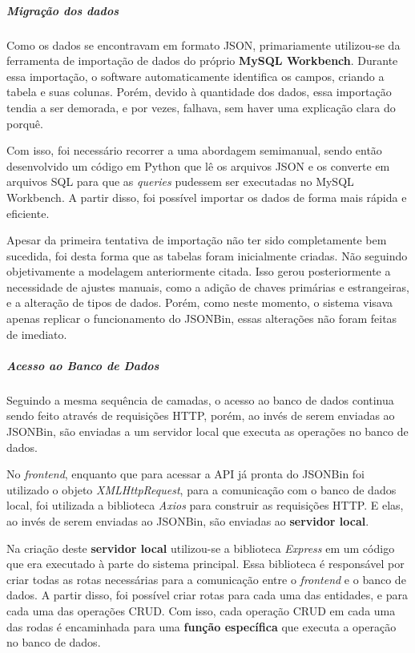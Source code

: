 \subparagraph*{Migração dos dados}

Como os dados se encontravam em formato JSON, primariamente utilizou-se da ferramenta de importação de dados do próprio \textbf{MySQL Workbench}. Durante essa importação, o software automaticamente identifica os campos, criando a tabela e suas colunas. Porém, devido à quantidade dos dados, essa importação tendia a ser demorada, e por vezes, falhava, sem haver uma explicação clara do porquê.

Com isso, foi necessário recorrer a uma abordagem semimanual, sendo então desenvolvido um código em Python que lê os arquivos JSON e os converte em arquivos SQL para que as \textit{queries} pudessem ser executadas no MySQL Workbench. A partir disso, foi possível importar os dados de forma mais rápida e eficiente.

Apesar da primeira tentativa de importação não ter sido completamente bem sucedida, foi desta forma que as tabelas foram inicialmente criadas. Não seguindo objetivamente a modelagem anteriormente citada. Isso gerou posteriormente a necessidade de ajustes manuais, como a adição de chaves primárias e estrangeiras, e a alteração de tipos de dados. Porém, como neste momento, o sistema visava apenas replicar o funcionamento do JSONBin, essas alterações não foram feitas de imediato.


\subparagraph*{Acesso ao Banco de Dados}

Seguindo a mesma sequência de camadas, o acesso ao banco de dados continua sendo feito através de requisições HTTP, porém, ao invés de serem enviadas ao JSONBin, são enviadas a um servidor local que executa as operações no banco de dados.

No \textit{frontend}, enquanto que para acessar a API já pronta do JSONBin foi utilizado o objeto \textit{XMLHttpRequest}, para a comunicação com o banco de dados local, foi utilizada a biblioteca \textit{Axios} para construir as requisições HTTP. E elas, ao invés de serem enviadas ao JSONBin, são enviadas ao \textbf{servidor local}.

Na criação deste \textbf{servidor local} utilizou-se a biblioteca \textit{Express} em um código que era executado à parte do sistema principal. Essa biblioteca é responsável por criar todas as rotas necessárias para a comunicação entre o \textit{frontend} e o banco de dados. A partir disso, foi possível criar rotas para cada uma das entidades, e para cada uma das operações CRUD. Com isso, cada operação CRUD em cada uma das rodas é encaminhada para uma \textbf{função específica} que executa a operação no banco de dados.

